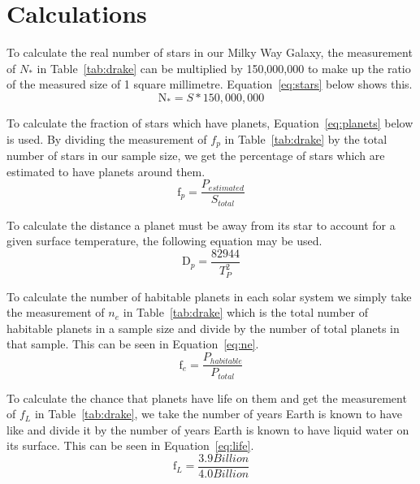 \documentclass{article}
\begin{document}

\section{Calculations}
\label{sec:calc}

To calculate the real number of stars in our Milky Way Galaxy, the measurement of ${N}_{*}$ in Table~\ref{tab:drake} can be
multiplied by 150,000,000 to make up the ratio of the measured size of 1 square millimetre. Equation~\ref{eq:stars} below 
shows this.
\begin{equation}
\label{eq:stars}
\text{N}_{*} = S * 150,000,000
\end{equation}

To calculate the fraction of stars which have planets, Equation~\ref{eq:planets} below is used. By dividing the measurement of
${f}_{p}$ in Table~\ref{tab:drake} by the total number of stars in our sample size, we get the percentage of stars which are 
estimated to have planets around them.
\begin{equation}
\label{eq:planets}
\text{f}_{p} = \frac{{P}_{estimated}}{{S}_{total}}
\end{equation}

To calculate the distance a planet must be away from its star to account for a given surface temperature, the following
equation may be used.
\begin{equation}
\label{eq:mm}
\text{D}_{p} = \frac{82944}{{T}_{P}^{2}}
\end{equation}

To calculate the number of habitable planets in each solar system we simply take the measurement of 
${n}_{e}$ in Table~\ref{tab:drake} which is the total number of habitable planets in a sample size and divide by the number 
of total planets in that sample. This can be seen in Equation~\ref{eq:ne}.
\begin{equation}
\label{eq:ne}
\text{f}_{e} = \frac{{P}_{habitable}}{{P}_{total}}
\end{equation}

To calculate the chance that planets have life on them and get the measurement of ${f}_{L}$ in Table~\ref{tab:drake}, 
we take the number of years Earth is known to have like and divide it by the number of years Earth is known to have liquid
water on its surface. This can be seen in Equation~\ref{eq:life}.
\begin{equation}
\label{eq:life}
\text{f}_{L} = \frac{3.9 Billion}{4.0 Billion}
\end{equation}
\end{document}

